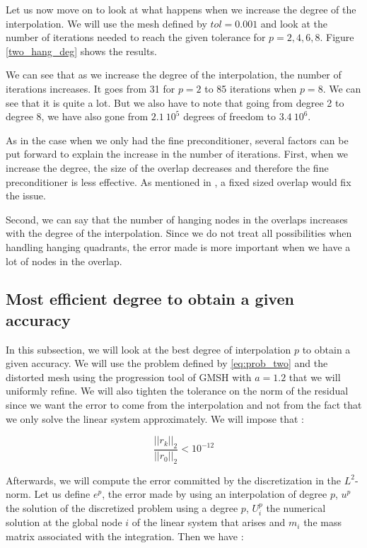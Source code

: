 Let us now move on to look at what happens when we increase the degree of the interpolation. We will use the mesh defined by $tol = 0.001$ and look at the number of iterations needed to reach the given tolerance for $p=2,4,6,8$. Figure \ref{two_hang_deg} shows the results. 

We can see that as we increase the degree of the interpolation, the number of iterations increases. It goes from 31 for $p=2$ to 85 iterations when $p=8$. We can see that it is quite a lot. But we also have to note that going from degree 2 to degree 8, we have also gone from $2.1\:10^5$ degrees of freedom to $3.4\:10^6$.

As in the case when we only had the fine preconditioner, several factors can be put forward to explain the increase in the number of iterations. First, when we increase the degree, the size of the overlap decreases and therefore the fine preconditioner is less effective. As mentioned in \cite{overlap_constant}, a fixed sized overlap would fix the issue. 

Second, we can say that the number of hanging nodes in the overlaps increases with the degree of the interpolation. Since we do not treat all possibilities when handling hanging quadrants, the error made is more important when we have a lot of nodes in the overlap.


\subsection{Most efficient degree to obtain a given accuracy}

In this subsection, we will look at the best degree of interpolation $p$ to obtain a given accuracy. We will use the problem defined by \ref{eq:prob_two} and the distorted mesh using the progression tool of GMSH with $a=1.2$ that we will uniformly refine. We will also tighten the tolerance on the norm of the residual since we want the error to come from the interpolation and not from the fact that we only solve the linear system approximately. We will impose that : 

$$ \frac{||r_k||_2}{||r_0||_2} < 10^{-12} $$

Afterwards, we will compute the error committed by the discretization in the $L^2$-norm. Let us define $e^p$, the error made by using an interpolation of degree $p$, $u^p$ the solution of the discretized problem using a degree $p$, $U^p_i$ the numerical solution at the global node $i$ of the linear system that arises and $m_i$ the mass matrix associated with the integration. Then we have :  


